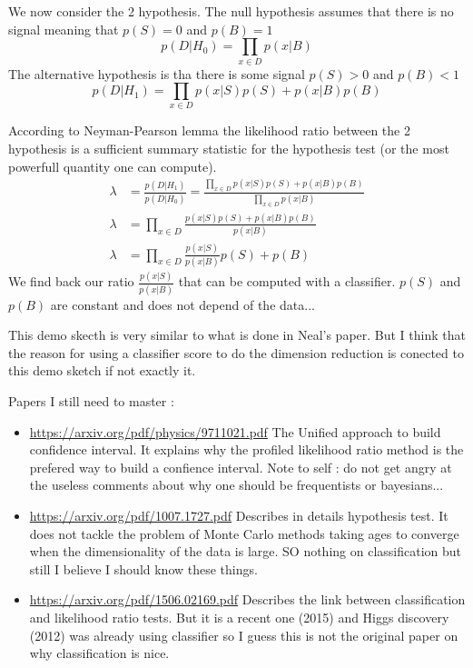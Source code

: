 We now consider the 2 hypothesis.
The null hypothesis assumes that there is no signal meaning that $p(S) = 0$ and $p(B) = 1$
\begin{equation}
	p(D |H_0) = \prod_{x\in D} p(x|B)
\end{equation}
The alternative hypothesis is tha there is some signal $p(S) > 0$ and $p(B) < 1$
\begin{equation}
	p(D | H_1) = \prod_{x\in D} p(x|S) p(S) + p(x|B) p(B)
\end{equation}

According to Neyman-Pearson lemma \cite{neyman_pearson_1933} the likelihood ratio between the 2 hypothesis is a sufficient summary statistic for the hypothesis test (or the most powerfull quantity one can compute).
\begin{align}
	\lambda & = \frac{p(D | H_1)}{p(D |H_0)} = \frac{\prod_{x\in D} p(x|S) p(S) + p(x|B) p(B)}{\prod_{x\in D} p(x|B)} \\
	\lambda & = \prod_{x\in D} \frac{ p(x|S) p(S) + p(x|B) p(B)}{p(x|B)} \\
	\lambda & = \prod_{x\in D}  \frac{p(x|S)}{p(x|B)}  p(S) + p(B)
\end{align}
We find back our ratio $\frac{p(x|S)}{p(x|B)}$ that can be computed with a classifier.
$p(S)$ and $p(B)$ are constant and does not depend of the data...

This demo skecth is very similar to what is done in Neal's paper.
But I think that the reason for using a classifier score to do the dimension reduction is conected to this demo sketch if not exactly it. 



Papers I still need to master :
\begin{itemize}
 	\item \url{https://arxiv.org/pdf/physics/9711021.pdf} The Unified approach to build confidence interval. It explains why the profiled likelihood ratio method is the prefered way to build a confience interval. Note to self : do not get angry at the useless comments about why one should be frequentists or bayesians...
 	\item \url{https://arxiv.org/pdf/1007.1727.pdf} Describes in details hypothesis test. It does not tackle the problem of Monte Carlo methods taking ages to converge when the dimensionality of the data is large. SO nothing on classification but still I believe I should know these things.
 	\item \url{https://arxiv.org/pdf/1506.02169.pdf} Describes the link between classification and likelihood ratio tests. But it is a recent one (2015) and Higgs discovery (2012) was already using classifier so I guess this is not the original paper on why classification is nice.
 \end{itemize} 


